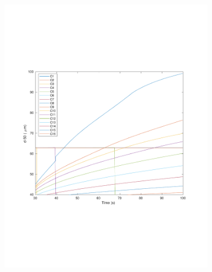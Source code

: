 \documentclass[preprint,11pt,authoryear]{elsarticle}
\begin{document}
\begin{figure}
\begin{subfigure}{.45\textwidth}
\centering
\includegraphics[scale=0.49]{rslts_pbm_d50_128_200.pdf}
\caption{}
\label{fig:rslts_PBM_2mm_d50}
\end{subfigure}\hfill
\begin{subfigure}{.45\textwidth}

\end{subfigure}
\end{figure}
\end{document}
